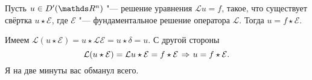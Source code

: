 \begin{The}
  Пусть $u\in D'(\R^n)$ "--- решение уравнения $\mathcal L u = f$, такое, что существует свёртка $u\star \mathcal E$, где $\mathcal E$ "--- фундаментальное решение оператора $\mathcal L$. Тогда $u = f\star \mathcal E$.
\end{The}

\begin{Proof}
  Имеем $\mathcal L(u\star\mathcal E) = u\star \mathcal L\mathcal E = u\star \delta = u$. С другой стороны
\[
  \mathcal L(u\star \mathcal E) = \mathcal L u\star\mathcal E = f\star\mathcal E\imp u = f\star \mathcal E.
 \]
Я на две минуты вас обманул всего.
\end{Proof}
